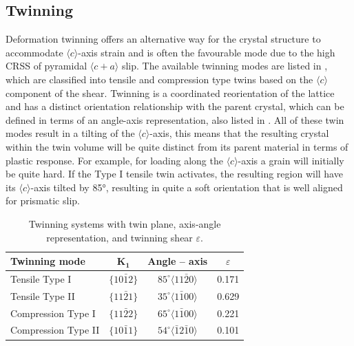 \subsection{Twinning}
Deformation twinning offers an alternative way for the crystal structure to accommodate $\langle c \rangle$-axis strain and is often the favourable mode due to the high CRSS of pyramidal $\langle c + a \rangle$ slip.
The available twinning modes are listed in , which are classified into tensile and compression type twins based on the $\langle c \rangle$ component of the shear.
Twinning is a coordinated reorientation of the lattice and has a distinct orientation relationship with the parent crystal, which can be defined in terms of an angle-axis representation, also listed in .
All of these twin modes result in a tilting of the $\langle c \rangle$-axis, this means that the resulting crystal within the twin volume will be quite distinct from its parent material in terms of plastic response.
For example, for loading along the $\langle c \rangle$-axis a grain will initially be quite hard. If the Type I tensile twin activates, the resulting region will have its $\langle c \rangle$-axis tilted by 85°, resulting in quite a soft orientation that is well aligned for prismatic slip.

\begin{table}[h]
  \vspace{\baselineskip}
  \centering
  \begin{tabular}{l c c c}
    \hline
    \rowcolor{gray!10}
    \textbf{Twinning mode} & $\mathbf{K_1}$   & \textbf{Angle – axis}                       & $\varepsilon$ \\
    \hline
    Tensile Type I         & $\{10\bar{1}2\}$ & $85^\circ \langle 11\bar{2}0 \rangle$       & 0.171         \\
    Tensile Type II        & $\{11\bar{2}1\}$ & $35^\circ \langle 1\bar{1}00 \rangle$       & 0.629         \\
    Compression Type I     & $\{11\bar{2}2\}$ & $65^\circ \langle 1\bar{1}00 \rangle$       & 0.221         \\
    Compression Type II    & $\{10\bar{1}1\}$ & $54^\circ \langle \bar{1}2\bar{1}0 \rangle$ & 0.101         \\
    \hline
  \end{tabular}
  \caption{Twinning systems with twin plane, axis-angle representation, and twinning shear $\varepsilon$. \cite{nervoStudyDeformationTwinning2016}}
  \label{table.twin-modes}
\end{table}

